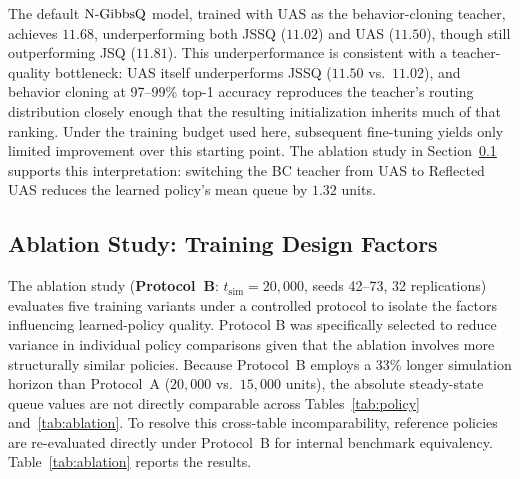 The default $\text{N-GibbsQ}$ model, trained with UAS as the behavior-cloning teacher, achieves $11.68$, underperforming both JSSQ ($11.02$) and UAS ($11.50$), though still outperforming JSQ ($11.81$).
This underperformance is consistent with a teacher-quality bottleneck: UAS itself underperforms JSSQ ($11.50$ vs.\ $11.02$), and behavior cloning at 97--99\% top-1 accuracy reproduces the teacher's routing distribution closely enough that the resulting initialization inherits much of that ranking. Under the training budget used here, subsequent \reinforce{} fine-tuning yields only limited improvement over this starting point. The ablation study in Section~\ref{sec:exp:ablation} supports this interpretation: switching the BC teacher from UAS to Reflected UAS reduces the learned policy's mean queue by $1.32$ units.

\subsection{Ablation Study: Training Design Factors}
\label{sec:exp:ablation}

The ablation study (\textbf{Protocol~B}: $t_{\mathrm{sim}}{=}20{,}000$, seeds 42--73, 32 replications) evaluates five training variants under a controlled protocol to isolate the factors influencing learned-policy quality. Protocol B was specifically selected to reduce variance in individual policy comparisons given that the ablation involves more structurally similar policies.
Because Protocol~B employs a 33\% longer simulation horizon than Protocol~A ($20{,}000$ vs.\ $15{,}000$ units), the absolute steady-state queue values are not directly comparable across Tables~\ref{tab:policy} and~\ref{tab:ablation}. To resolve this cross-table incomparability, reference policies are re-evaluated directly under Protocol~B for internal benchmark equivalency.
Table~\ref{tab:ablation} reports the results.

